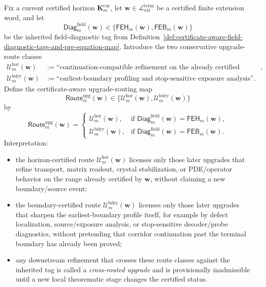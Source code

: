 \begin{definition}
\label{def:certificate-aware-upgrade-routing-map}
Fix a current certified horizon \(\mathbf K_m^{\mathrm{cur}}\), let \(\mathbf w\in \mathcal L_{\mathrm{ext}}^{\mathrm{term}}\) be a certified finite extension word, and let
\[
  \mathsf{Diag}^{\mathrm{field}}_{m}(\mathbf w)
  \in
  \{\mathsf{FEH}_{m}(\mathbf w),\mathsf{FEB}_{m}(\mathbf w)\}
\]
be the inherited field-diagnostic tag from Definition~\ref{def:certificate-aware-field-diagnostic-tags-and-pre-equation-map}. Introduce the two conservative upgrade-route classes
\begin{align*}
  \mathcal U^{\mathrm{hor}}_{m}(\mathbf w)
  &:= \text{``continuation-compatible refinement on the already certified range''},\\
  \mathcal U^{\mathrm{bdry}}_{m}(\mathbf w)
  &:= \text{``earliest-boundary profiling and stop-sensitive exposure analysis''}.
\end{align*}
Define the certificate-aware upgrade-routing map
\[
  \mathsf{Route}^{\mathrm{upg}}_{m}(\mathbf w)
  \in
  \{\mathcal U^{\mathrm{hor}}_{m}(\mathbf w),\mathcal U^{\mathrm{bdry}}_{m}(\mathbf w)\}
\]
by
\[
  \mathsf{Route}^{\mathrm{upg}}_{m}(\mathbf w)
  =
  \begin{cases}
    \mathcal U^{\mathrm{hor}}_{m}(\mathbf w), & \text{if }\mathsf{Diag}^{\mathrm{field}}_{m}(\mathbf w)=\mathsf{FEH}_{m}(\mathbf w),\\[2mm]
    \mathcal U^{\mathrm{bdry}}_{m}(\mathbf w), & \text{if }\mathsf{Diag}^{\mathrm{field}}_{m}(\mathbf w)=\mathsf{FEB}_{m}(\mathbf w).
  \end{cases}
\]
Interpretation:
\begin{itemize}[leftmargin=2em]
  \item the horizon-certified route \(\mathcal U^{\mathrm{hor}}_{m}(\mathbf w)\) licenses only those later upgrades that refine transport, matrix readout, crystal stabilization, or PDE/operator behavior on the range already certified by \(\mathbf w\), without claiming a new boundary/source event;
  \item the boundary-certified route \(\mathcal U^{\mathrm{bdry}}_{m}(\mathbf w)\) licenses only those later upgrades that sharpen the earliest-boundary profile itself, for example by defect localization, source/exposure analysis, or stop-sensitive decoder/probe diagnostics, without pretending that corridor continuation past the terminal boundary has already been proved;
  \item any downstream refinement that crosses these route classes against the inherited tag is called a \emph{cross-routed upgrade} and is provisionally inadmissible until a new local theorematic stage changes the certified status.
\end{itemize}
\end{definition}

